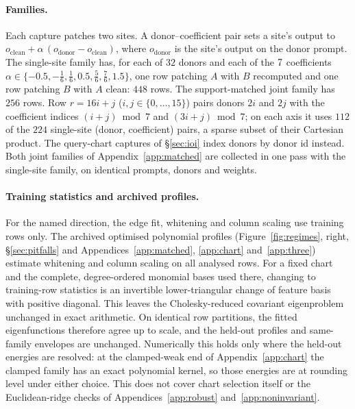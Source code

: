 \paragraph{Families.} Each capture patches two sites. A donor--coefficient pair sets a site's output to
$o_{\mathrm{clean}}+\alpha\,(o_{\mathrm{donor}}-o_{\mathrm{clean}})$, where $o_{\mathrm{donor}}$ is the site's output on
the donor prompt. The single-site family has, for each of $32$ donors and each
of the $7$ coefficients $\alpha\in\{-0.5,-\tfrac16,\tfrac16,0.5,\tfrac56,\tfrac76,1.5\}$, one row patching $A$
with $B$ recomputed and one row patching $B$ with $A$ clean: $448$ rows. The support-matched joint family has $256$
rows. Row $r=16i+j$ ($i,j\in\{0,\dots,15\}$) pairs donors $2i$ and $2j$ with the coefficient indices $(i+j)\bmod 7$
and $(3i+j)\bmod 7$; on each axis it uses $112$ of the $224$ single-site (donor, coefficient) pairs, a sparse subset
of their Cartesian product. The query-chart captures of \S\ref{sec:ioi} index donors by donor id instead. Both joint
families of Appendix~\ref{app:matched} are collected in one pass with the single-site family, on identical prompts,
donors and weights.

\paragraph{Training statistics and archived profiles.} For the named direction, the edge fit, whitening and
column scaling use training rows only. The archived optimised
polynomial profiles (Figure~\ref{fig:regimes}, right, \S\ref{sec:pitfalls} and Appendices~\ref{app:matched},
\ref{app:chart} and~\ref{app:three}) estimate whitening and column scaling on all analysed rows. For a fixed chart
and the complete, degree-ordered monomial bases used there, changing to training-row statistics is an invertible
lower-triangular change of feature basis with positive diagonal. This leaves the Cholesky-reduced covariant
eigenproblem unchanged in exact arithmetic. On identical row partitions, the fitted eigenfunctions therefore agree
up to scale, and the held-out profiles and same-family envelopes are unchanged. Numerically this holds only where the
held-out energies are resolved: at the clamped-weak end of Appendix~\ref{app:chart} the clamped family has an exact
polynomial kernel, so those energies are at rounding level under either choice. This does not cover chart selection
itself or the Euclidean-ridge checks of Appendices~\ref{app:robust} and~\ref{app:noninvariant}.

